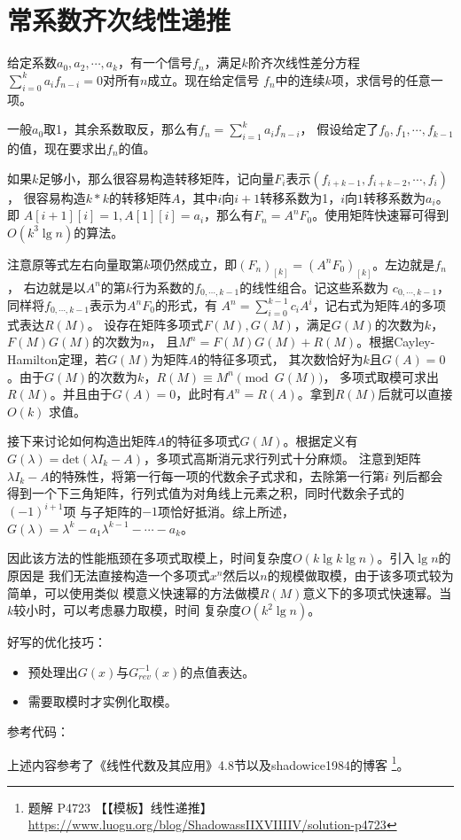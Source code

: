 \section{常系数齐次线性递推}
给定系数$a_0,a_2,\cdots,a_k$，有一个信号${f_n}$，满足$k$阶齐次线性差分方程
$\displaystyle \sum_{i=0}^k{a_if_{n-i}}=0$对所有$n$成立。现在给定信号
${f_n}$中的连续$k$项，求信号的任意一项。

一般$a_0$取1，其余系数取反，那么有$\displaystyle f_n=\sum_{i=1}^k{a_if_{n-i}}$，
假设给定了$f_0,f_1,\cdots,f_{k-1}$的值，现在要求出$f_n$的值。

如果$k$足够小，那么很容易构造转移矩阵，记向量$F_i$表示$(f_{i+k-1},f_{i+k-2},\cdots,f_i)$，
很容易构造$k*k$的转移矩阵$A$，其中$i$向$i+1$转移系数为1，$i$向$1$转移系数为$a_i$。即
$A[i+1][i]=1,A[1][i]=a_i$，那么有$F_n=A^nF_0$。使用矩阵快速幂可得到
$O(k^3\lg n)$的算法。

注意原等式左右向量取第$k$项仍然成立，即$(F_n)_{[k]}=(A^nF_0)_{[k]}$。左边就是$f_n$，
右边就是以$A^n$的第$k$行为系数的$f_{0,\cdots,k-1}$的线性组合。记这些系数为
$c_{0,\cdots,k-1}$，同样将$f_{0,\cdots,k-1}$表示为$A^nF_0$的形式，有
$A^n=\displaystyle \sum_{i=0}^{k-1}{c_iA^i}$，记右式为矩阵$A$的多项式表达$R(M)$。
设存在矩阵多项式$F(M),G(M)$，满足$G(M)$的次数为$k$，$F(M)G(M)$的次数为$n$，
且$M^n=F(M)G(M)+R(M)$。根据Cayley-Hamilton定理，若$G(M)$为矩阵$A$的特征多项式，
其次数恰好为$k$且$G(A)=0$。由于$G(M)$的次数为$k$，$R(M)\equiv M^n\pmod{G(M)}$，
多项式取模可求出$R(M)$。并且由于$G(A)=0$，此时有$A^n=R(A)$。拿到$R(M)$后就可以直接$O(k)$
求值。

接下来讨论如何构造出矩阵$A$的特征多项式$G(M)$。根据定义有
$G(\lambda)=\textrm{det}(\lambda I_k-A)$，多项式高斯消元求行列式十分麻烦。
注意到矩阵$\lambda I_k-A$的特殊性，将第一行每一项的代数余子式求和，去除第一行第$i$
列后都会得到一个下三角矩阵，行列式值为对角线上元素之积，同时代数余子式的$(-1)^{i+1}$项
与子矩阵的$-1$项恰好抵消。综上所述，$G(\lambda)=\lambda^k-a_1\lambda^{k-1}-\cdots-a_k$。

因此该方法的性能瓶颈在多项式取模上，时间复杂度$O(k\lg k\lg n)$。引入$\lg n$的原因是
我们无法直接构造一个多项式$x^n$然后以$n$的规模做取模，由于该多项式较为简单，可以使用类似
模意义快速幂的方法做模$R(M)$意义下的多项式快速幂。当$k$较小时，可以考虑暴力取模，时间
复杂度$O(k^2\lg n)$。

好写的优化技巧：
\begin{itemize}
    \item 预处理出$G(x)$与$G_{rev}^{-1}(x)$的点值表达。
    \item 需要取模时才实例化取模。
\end{itemize}

参考代码：


上述内容参考了《线性代数及其应用》\cite{LAIA5}4.8节以及shadowice1984的博客
\footnote{
    题解 P4723 【【模板】线性递推】
    \url{https://www.luogu.org/blog/ShadowassIIXVIIIIV/solution-p4723}
}。
